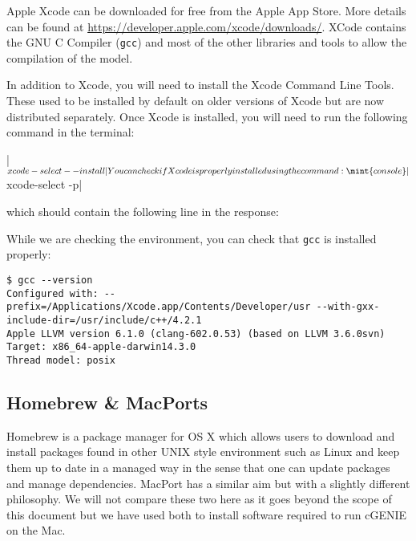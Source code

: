 \documentclass{scrartcl}
\begin{document}
Apple Xcode can be downloaded for free from the Apple App Store. More details
can be found at \url{https://developer.apple.com/xcode/downloads/}. XCode
contains the GNU C Compiler (\texttt{gcc}) and most of the other libraries and
tools to allow the compilation of the model.

In addition to Xcode, you will need to install the Xcode Command Line Tools.
These used to be installed by default on older versions of Xcode but are now
distributed separately. Once Xcode is installed, you will need to run the
following command in the terminal:

|$ xcode-select --install| %

You can check if Xcode is properly installed using the command:

\mint{console}|$ xcode-select -p| %

which should contain the following line in the response:


While we are checking the environment, you can check that \texttt{gcc} is installed properly:

\begin{verbatim}
$ gcc --version
Configured with: --prefix=/Applications/Xcode.app/Contents/Developer/usr --with-gxx-include-dir=/usr/include/c++/4.2.1
Apple LLVM version 6.1.0 (clang-602.0.53) (based on LLVM 3.6.0svn)
Target: x86_64-apple-darwin14.3.0
Thread model: posix
\end{verbatim}

\subsection{Homebrew \& MacPorts}

Homebrew is a package manager for OS X which allows users to download and
install packages found in other UNIX style environment such as Linux and keep
them up to date in a managed way in the sense that one can update packages and
manage dependencies. MacPort has a similar aim but with a slightly different
philosophy. We will not compare these two here as it goes beyond the scope of
this document but we have used both to install software required to run cGENIE
on the Mac.
\end{document}
